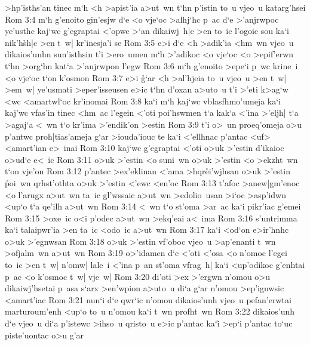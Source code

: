 >hp'isths'an
tinec
m`h
<h
>apist'ia
a>ut~wn
t`hn
p'istin
to~u
vjeo~u
katarg'hsei\bibvsend
\vs Rom 3:4
m`h
g'enoito
gin'esjw
d`e
<o
vje`oc
>alhj`hc
p~ac
d`e
>'anjrwpoc
ye'usthc
kaj`wc
g'egraptai
<'opwc
>`an
dikaiwj~h|c
>en
to~ic
l'ogoic
sou
ka`i
nik'h\r{s}h|c
>en
t~w|
kr'inesja'i
se\bibvsend
\vs Rom 3:5
e>i
d`e
<h
>adik'ia
<hm~wn
vjeo~u
dikaios'unhn
sun'isthsin
t'i
>ero~umen
m`h
>'adikoc
<o
vje`oc
<o
>epif'erwn
t`hn
>org`hn
kat`a
>'anjrwpon
l'egw\bibvsend
\vs Rom 3:6
m`h
g'enoito
>epe`i
p~wc
krine~i
<o
vje`oc
t`on
k'osmon\bibvsend
\vs Rom 3:7
e>i
\r{g}`ar
<h
>al'hjeia
to~u
vjeo~u
>en
t~w|
>em~w|
ye'usmati
>eper'isseusen
e>ic
t`hn
d'oxan
a>uto~u
t'i
>'eti
k>ag`w
<wc
<amartwl`oc
kr'inomai\bibvsend
\vs Rom 3:8
ka`i
m`h
kaj`wc
vblasfhmo'umeja
ka`i
kaj'wc
vfas'in
tinec
<hm~ac
l'egein
<'oti
poi'hswmen
t`a
kak`a
<'ina
>'eljh|
t`a
>agaj`a
<~wn
t`o
kr'ima
>'endik'on
>estin\bibvsend
\vs Rom 3:9
t'i
o>~un
proeq'omeja
o>u
p'antwc
proh|tias'ameja
g`ar
>iouda'iouc
te
ka`i
<'ellhnac
p'antac
<uf>
<amart'ian
e>~inai\bibvsend
\vs Rom 3:10
kaj`wc
g'egraptai
<'oti
o>uk
>'estin
d'ikaioc
o>ud`e
e<~ic\bibvsend
\vs Rom 3:11
o>uk
>'estin
<o
suni~wn
o>uk
>'estin
<o
>ekzht~wn
t`on
vje'on\bibvsend
\vs Rom 3:12
p'antec
>ex'eklinan
<'ama
>hqr\r{e}i'wjhsan
o>uk
>'estin
\r{p}oi~wn
qrhst'othta
o>uk
>'estin
<'ewc
<en'oc\bibvsend
\vs Rom 3:13
t'afoc
>anew|gm'enoc
<o
l'arugx
a>ut~wn
ta~ic
gl'wssaic
a>ut~wn
>edolio~usan
>i`oc
>asp'idwn
<up`o
t`a
qe'ilh
a>ut~wn\bibvsend
\vs Rom 3:14
<~wn
t`o
st'oma
>ar~ac
ka`i
pikr'iac
g'emei\bibvsend
\vs Rom 3:15
>oxe~ic
o<i
p'odec
a>ut~wn
>ekq'eai
a<~ima\bibvsend
\vs Rom 3:16
s'untrimma
ka`i
talaipwr'ia
>en
ta~ic
<odo~ic
a>ut~wn\bibvsend
\vs Rom 3:17
ka`i
<od`on
e>ir'hnhc
o>uk
>'egnwsan\bibvsend
\vs Rom 3:18
o>uk
>'estin
vf'oboc
vjeo~u
>ap'enanti
t~wn
>ofjalm~wn
a>ut~wn\bibvsend
\vs Rom 3:19
o>'idamen
d`e
<'oti
<'osa
<o
n'omoc
l'egei
to~ic
>en
t~w|
n'omw|
lale~i
<'ina
p~an
st'oma
vfrag~h|
ka`i
<up'odikoc
g'enhtai
p~ac
<o
k'osmoc
t~w|
vje~w|\bibvsend
\vs Rom 3:20
di'oti
>ex
>'ergwn
n'omou
o>u
dikaiwj'hsetai
p~asa
s`arx
>en'wpion
a>uto~u
di`a
g`ar
n'omou
>ep'ignwsic
<amart'iac\bibvsend
\vs Rom 3:21
nun`i
d`e
qwr`ic
n'omou
dikaios'unh
vjeo~u
pefan'erwtai
marturoum'enh
<up`o
to~u
n'omou
ka`i
t~wn
profht~wn\bibvsend
\vs Rom 3:22
dikaios'unh
d`e
vjeo~u
di`a
p'istewc
>ihso~u
qristo~u
e>ic
p'antac
ka`i\r{}
>ep`i
p'antac
to`uc
piste'uontac
o>u
g'ar
